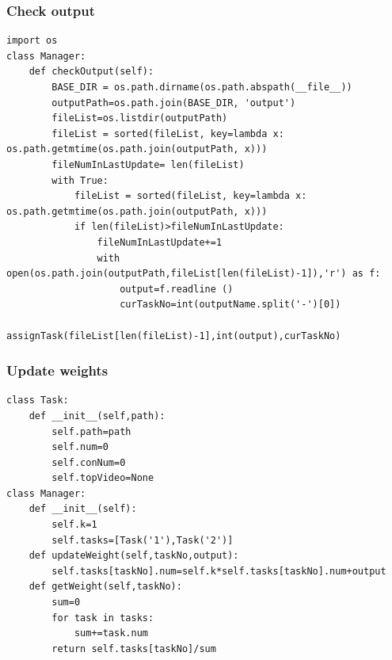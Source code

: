 \documentclass{article}
\begin{document}
            \subsubsection{Check output}
                    \begin{lstlisting}
import os
class Manager:              
    def checkOutput(self):
        BASE_DIR = os.path.dirname(os.path.abspath(__file__))
        outputPath=os.path.join(BASE_DIR, 'output')
        fileList=os.listdir(outputPath)
        fileList = sorted(fileList, key=lambda x: os.path.getmtime(os.path.join(outputPath, x)))
        fileNumInLastUpdate= len(fileList)
        with True:
            fileList = sorted(fileList, key=lambda x: os.path.getmtime(os.path.join(outputPath, x)))
            if len(fileList)>fileNumInLastUpdate:
                fileNumInLastUpdate+=1
                with open(os.path.join(outputPath,fileList[len(fileList)-1]),'r') as f:
                    output=f.readline ()
                    curTaskNo=int(outputName.split('-')[0])
                    assignTask(fileList[len(fileList)-1],int(output),curTaskNo)
                    \end{lstlisting}
            \subsubsection{Update weights}
                \begin{lstlisting}
class Task:
    def __init__(self,path):
        self.path=path
        self.num=0
        self.conNum=0
        self.topVideo=None
class Manager:
    def __init__(self):
        self.k=1
        self.tasks=[Task('1'),Task('2')]
    def updateWeight(self,taskNo,output):
        self.tasks[taskNo].num=self.k*self.tasks[taskNo].num+output
    def getWeight(self,taskNo):
        sum=0
        for task in tasks:
            sum+=task.num
        return self.tasks[taskNo]/sum
                \end{lstlisting}
\end{document}
